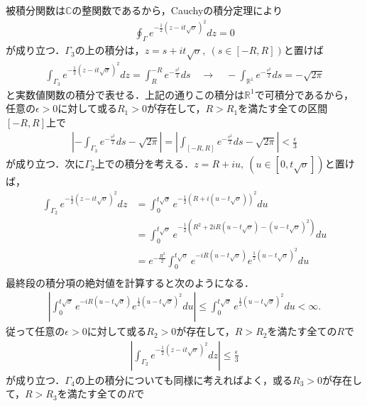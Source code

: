 \documentclass[a4j,papersize,disablejfam,slide,14pt]{jsarticle}
\def\exp#1{e^{#1}} %
\begin{document}
    被積分関数は$\mathbb{C}$の整関数であるから，{\rm Cauchy}の積分定理により
    \begin{align}
    	\oint_{\Gamma} \exp{-\frac{1}{2} (z - it\sqrt{\sigma})^2} dz = 0
    \end{align}
    が成り立つ．$\Gamma_3$の上の積分は，$z = s+it\sqrt{\sigma},\ (s \in [-R, R])$と置けば
    \begin{align}
    	\int_{\Gamma_3} \exp{-\frac{1}{2} (z - it\sqrt{\sigma})^2} dz = \int_{R}^{-R} \exp{-\frac{s^2}{2}} ds \quad\to\quad -\int_{\mathbb{R}^1} \exp{-\frac{s^2}{2}} ds = -\sqrt{2\pi}
    \end{align}
    と実数値関数の積分で表せる．上記の通りこの積分は$\mathbb{R}^1$で可積分であるから，任意の$\epsilon > 0$に対して或る$R_1 > 0$が存在して，$R > R_1$を満たす全ての区間$[-R, R]$上で
    \begin{align}
    	\left| -\int_{\Gamma_3} \exp{-\frac{s^2}{2}} ds - \sqrt{2\pi} \right| = \left| \int_{[-R, R]} \exp{-\frac{s^2}{2}} ds - \sqrt{2\pi} \right| < \frac{\epsilon}{3}
    \end{align}
    が成り立つ．次に$\Gamma_2$上での積分を考える．$z = R + iu,\ (u \in [0, t\sqrt{\sigma}])$と置けば，
    \begin{align}
    	\int_{\Gamma_2} \exp{-\frac{1}{2} (z - it\sqrt{\sigma})^2} dz &= \int_{0}^{t\sqrt{\sigma}} \exp{-\frac{1}{2} \left( R + i(u-t\sqrt{\sigma}) \right)^2} du \\
        &= \int_{0}^{t\sqrt{\sigma}} \exp{-\frac{1}{2} \left( R^2 + 2iR(u-t\sqrt{\sigma}) - (u-t\sqrt{\sigma})^2 \right)} du \\
        &= \exp{-\frac{R^2}{2}} \int_{0}^{t\sqrt{\sigma}} \exp{ -iR(u-t\sqrt{\sigma})} \exp{\frac{1}{2}(u-t\sqrt{\sigma})^2} du \\
    \end{align}
    最終段の積分項の絶対値を計算すると次のようになる．
    \begin{align}
    	\left| \int_{0}^{t\sqrt{\sigma}} \exp{ -iR(u-t\sqrt{\sigma})} \exp{\frac{1}{2}(u-t\sqrt{\sigma})^2} du \right| 
        \leq \int_{0}^{t\sqrt{\sigma}} \exp{\frac{1}{2}(u-t\sqrt{\sigma})^2} du < \infty.
    \end{align}
    従って任意の$\epsilon > 0$に対して或る$R_2 > 0$が存在して，$R > R_2$を満たす全ての$R$で
    \begin{align}
    	\left| \int_{\Gamma_2} \exp{-\frac{1}{2} (z - it\sqrt{\sigma})^2} dz \right| \leq \frac{\epsilon}{3}
    \end{align}
    が成り立つ．$\Gamma_4$の上の積分についても同様に考えればよく，或る$R_3 > 0$が存在して，$R > R_3$を満たす全ての$R$で
\end{document}
